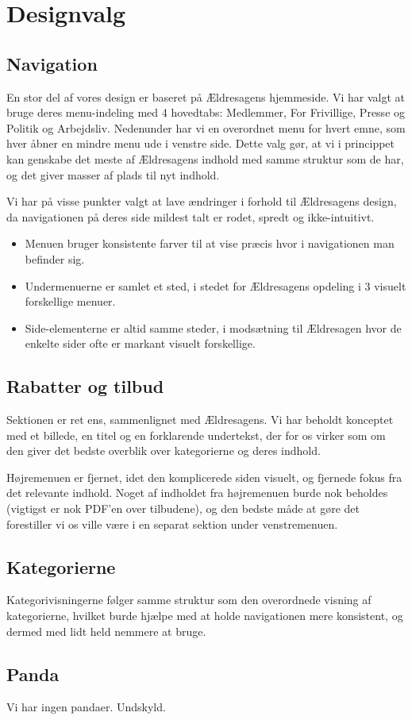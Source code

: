 \section{Designvalg}
\subsection{Navigation}
En stor del af vores design er baseret på Ældresagens hjemmeside. Vi har
valgt at bruge deres menu-indeling med 4 hovedtabs: Medlemmer, For Frivillige,
Presse og Politik og Arbejdsliv. Nedenunder har vi en overordnet menu for hvert
emne, som hver åbner en mindre menu ude i venstre side. Dette valg gør, at vi i
princippet kan genskabe det meste af Ældresagens indhold med samme struktur som de
har, og det giver masser af plads til nyt indhold. 

Vi har på visse punkter valgt at lave ændringer i forhold til Ældresagens design, da
navigationen på deres side mildest talt er rodet, spredt og ikke-intuitivt. 

\begin{itemize}
\item Menuen bruger konsistente farver til at vise præcis hvor i navigationen man befinder sig.
\item Undermenuerne er samlet et sted, i stedet for Ældresagens opdeling i 3 visuelt forskellige menuer.
\item Side-elementerne er altid samme steder, i modsætning til Ældresagen hvor de enkelte sider
      ofte er markant visuelt forskellige.
\end{itemize}

\subsection{Rabatter og tilbud}
Sektionen er ret ens, sammenlignet med Ældresagens. Vi har beholdt konceptet med et billede, en titel og en forklarende undertekst, der for os virker som om den giver det bedste overblik over kategorierne og deres indhold.

Højremenuen er fjernet, idet den komplicerede siden visuelt, og fjernede fokus fra det relevante indhold.
Noget af indholdet fra højremenuen burde nok beholdes (vigtigst er nok PDF'en over tilbudene), og den bedste måde at gøre det forestiller vi os ville være i en separat sektion under venstremenuen. 

\subsection{Kategorierne}
Kategorivisningerne følger samme struktur som den overordnede visning af kategorierne, hvilket burde hjælpe med at holde navigationen mere konsistent, og dermed med lidt held nemmere at bruge. 

\subsection{Panda}
Vi har ingen pandaer. Undskyld.
